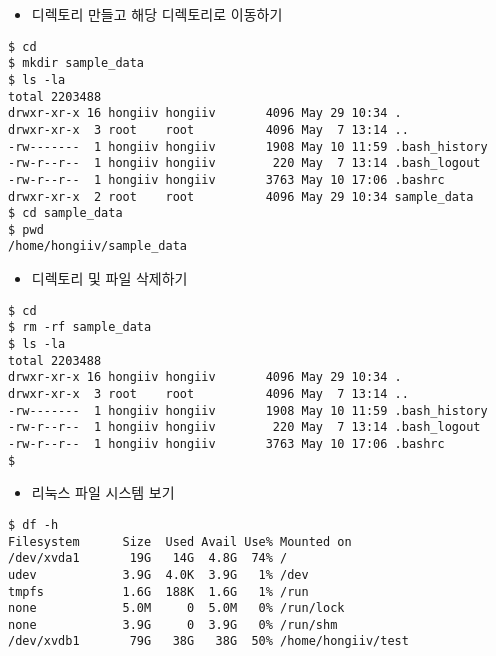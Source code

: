 \documentclass{article}
\begin{document}
\begin{itemize}
\item
  \begin{itemize}
  디렉토리 만들고 해당 디렉토리로 이동하기  
  \end{itemize}
\end{itemize}
\begin{lstlisting}[frame=single,style=Bash,xleftmargin=1.4cm,xrightmargin=1.4cm]
$ cd
$ mkdir sample_data
$ ls -la
total 2203488
drwxr-xr-x 16 hongiiv hongiiv       4096 May 29 10:34 .
drwxr-xr-x  3 root    root          4096 May  7 13:14 ..
-rw-------  1 hongiiv hongiiv       1908 May 10 11:59 .bash_history
-rw-r--r--  1 hongiiv hongiiv        220 May  7 13:14 .bash_logout
-rw-r--r--  1 hongiiv hongiiv       3763 May 10 17:06 .bashrc
drwxr-xr-x  2 root    root          4096 May 29 10:34 sample_data
$ cd sample_data
$ pwd
/home/hongiiv/sample_data
\end{lstlisting}

\begin{itemize}
\item
  \begin{itemize}
  디렉토리 및 파일 삭제하기  
  \end{itemize}
\end{itemize}
\begin{lstlisting}[frame=single,style=Bash,xleftmargin=1.4cm,xrightmargin=1.4cm]
$ cd
$ rm -rf sample_data
$ ls -la
total 2203488
drwxr-xr-x 16 hongiiv hongiiv       4096 May 29 10:34 .
drwxr-xr-x  3 root    root          4096 May  7 13:14 ..
-rw-------  1 hongiiv hongiiv       1908 May 10 11:59 .bash_history
-rw-r--r--  1 hongiiv hongiiv        220 May  7 13:14 .bash_logout
-rw-r--r--  1 hongiiv hongiiv       3763 May 10 17:06 .bashrc
$ 
\end{lstlisting}

\begin{itemize}
\item
  \begin{itemize}
  리눅스 파일 시스템 보기
  \end{itemize}
\end{itemize}
\begin{lstlisting}[frame=single,style=Bash,xleftmargin=1.4cm,xrightmargin=1.4cm]
$ df -h
Filesystem      Size  Used Avail Use% Mounted on
/dev/xvda1       19G   14G  4.8G  74% /
udev            3.9G  4.0K  3.9G   1% /dev
tmpfs           1.6G  188K  1.6G   1% /run
none            5.0M     0  5.0M   0% /run/lock
none            3.9G     0  3.9G   0% /run/shm
/dev/xvdb1       79G   38G   38G  50% /home/hongiiv/test
\end{lstlisting}
\end{document}
